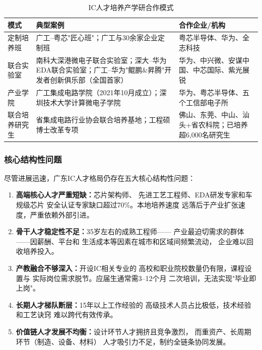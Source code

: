 \documentclass[12pt,a4paper]{article}
\newcommand{\tableHeaderRow}{\rowcolor{tealPrimary}\color{white}}
\newcommand{\tableOddRow}{\rowcolor{mintBG}}
\newcommand{\tableEvenRow}{\rowcolor{white}}
\begin{document}
\begin{table}[H]
\centering
\caption{IC人才培养产学研合作模式}
\label{tab:u-i_models}
\begin{tabular}{p{2.8cm}p{5.6cm}p{5.2cm}}
\toprule
\tableHeaderRow
\textbf{模式} & \textbf{典型案例} & \textbf{合作企业/机构} \\
\midrule
\tableOddRow  定制培养班 & 广工--粤芯"匠心班"；广工与30余家企业定制班 & 粤芯半导体、华为、全志科技 \\
\tableEvenRow 联合实验室 & 南科大深港微电子联合实验室；深大--华为EDA联合实验室；广工--华为"鲲鹏\&昇腾"开发者创新俱乐部（全国首家） & 华为、中兴微、安谋中国、中芯国际、紫光展锐 \\
\tableOddRow  产业学院   & 广工集成电路学院（2021年10月成立）；深圳技术大学计算微电子学院 & 华为、粤芯半导体、五个工信部电子所 \\
\tableEvenRow 联合培养研究生 & 省集成电路行业协会联合培养基地；工程硕博士改革专项 & 佛山、东莞、中山、汕头+省农科院；已培养超6,000名研究生 \\
\bottomrule
\end{tabular}
\end{table}

\subsubsection{核心结构性问题}

尽管进展迅速，广东IC人才格局仍存在五大核心结构性问题：

\begin{enumerate}[label=(\arabic*)]
    \item \textbf{高端核心人才严重短缺：}芯片架构师、
          先进工艺工程师、EDA研发专家和车规级芯片
          安全认证专家缺口超过70\%。本地培养速度
          远落后于产业扩张速度，严重依赖外部引进。
    \item \textbf{骨干人才稳定性不足：}35岁左右的成熟工程师——
          产业最迫切需求的群体——因薪酬、平台和
          生活成本等因素在城市和区域间频繁流动，
          企业难以回收培养投入。
    \item \textbf{产教融合不够深入：}开设IC相关专业的
          高校和职业院校数量仍有限，课程设置与
          实际岗位需求脱节。应届生通常需3--12个月
          二次培训，无法实现"毕业即上岗"。
    \item \textbf{长期人才梯队断层：}15年以上工作经验的
          高级技术人员占比极低，技术经验和工艺诀窍
          难以跨代有效传承。
    \item \textbf{价值链人才发展不均衡：}设计环节人才拥挤且竞争激烈，
          而重资产、长周期环节（制造、设备、材料）
          人才吸引力不足，制约全链条协同发展。
\end{enumerate}
\end{document}
